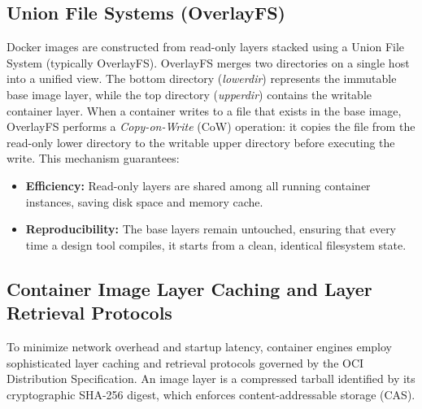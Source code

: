 \subsection{Union File Systems (OverlayFS)}
Docker images are constructed from read-only layers stacked using a Union File System (typically OverlayFS).
OverlayFS merges two directories on a single host into a unified view. The bottom directory (\textit{lowerdir}) represents the immutable base image layer, while the top directory (\textit{upperdir}) contains the writable container layer. When a container writes to a file that exists in the base image, OverlayFS performs a \textit{Copy-on-Write} (CoW) operation: it copies the file from the read-only lower directory to the writable upper directory before executing the write.
This mechanism guarantees:
\begin{itemize}
    \item \textbf{Efficiency:} Read-only layers are shared among all running container instances, saving disk space and memory cache.
    \item \textbf{Reproducibility:} The base layers remain untouched, ensuring that every time a design tool compiles, it starts from a clean, identical filesystem state.
\end{itemize}

\subsection{Container Image Layer Caching and Layer Retrieval Protocols}
To minimize network overhead and startup latency, container engines employ sophisticated layer caching and retrieval protocols governed by the OCI Distribution Specification. An image layer is a compressed tarball identified by its cryptographic SHA-256 digest, which enforces content-addressable storage (CAS).

